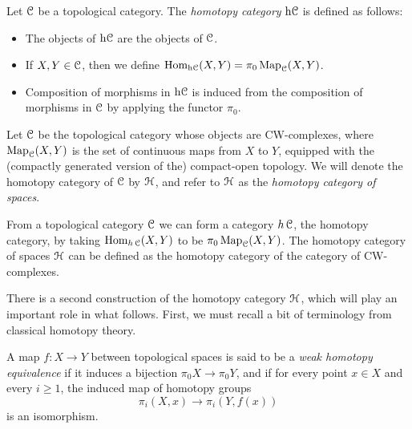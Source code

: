 \begin{definition}\label{vergen}
Let $\operatorname{\mathcal{C}}$ be a topological category. The {\it homotopy category} $\rm{h} \it{\operatorname{\mathcal{C}}}$
is defined as follows:
\begin{itemize}
\item The objects of $\rm{h} \it{\operatorname{\mathcal{C}}}$ are the objects of $\operatorname{\mathcal{C}}$.
\item If $X,Y \in \operatorname{\mathcal{C}}$, then we define $\operatorname{Hom}_{\rm{h} \it{\operatorname{\mathcal{C}}}}(X,Y)= \pi_0 \operatorname{{Map}}_{\operatorname{\mathcal{C}}}(X,Y)$.
\item Composition of morphisms in $\rm{h} \it{\operatorname{\mathcal{C}}}$ is induced from the composition of morphisms
in $\operatorname{\mathcal{C}}$ by applying the functor $\pi_0$.
\end{itemize}
\end{definition}

\begin{example}
Let $\operatorname{\mathcal{C}}$ be the topological category whose objects are CW-complexes, where
$\operatorname{{Map}}_{\operatorname{\mathcal{C}}}(X,Y)$ is the set of continuous maps from $X$ to $Y$, equipped with the
(compactly generated version of the) compact-open topology. We will denote the homotopy category of $\operatorname{\mathcal{C}}$ by $\operatorname{\mathcal{H}}$, and refer to $\operatorname{\mathcal{H}}$ as the {\it homotopy category of spaces}.
\end{example}
\begin{shaded}
From a topological category $\operatorname{\mathcal{C}}$ we can form a category $h\operatorname{\mathcal{C}}$, the homotopy category, by taking $\operatorname{Hom}_{h\operatorname{\mathcal{C}}}(X,Y)$ to be $\pi_0\operatorname{{Map}}_{\operatorname{\mathcal{C}}}(X,Y)$. The homotopy category of spaces $\operatorname{\mathcal{H}}$ can be defined as the homotopy category of the category of CW-complexes.
\end{shaded}

There is a second construction of the homotopy category $\operatorname{\mathcal{H}}$, which will play an important role in what follows. First, we must recall a bit of terminology from classical homotopy theory.

\begin{definition}
A map $f: X \rightarrow Y$ between topological spaces is said to be a {\it weak homotopy equivalence}
if it induces a bijection $\pi_0 X \rightarrow \pi_0 Y$, and if 
for every point $x \in X$ and every $i \geq 1$, the induced map of homotopy groups
$$ \pi_{i}(X,x) \rightarrow \pi_i(Y,f(x))$$ is an isomorphism.
\end{definition}

